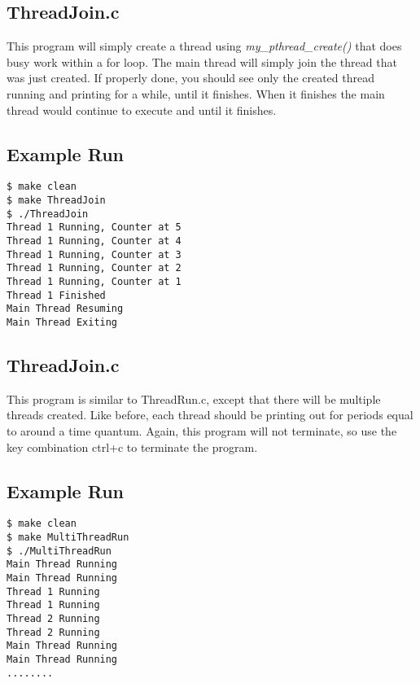 \documentclass{article}
\begin{document}
\subsection{ThreadJoin.c}
This program will simply create a thread using \textit{my\_pthread\_create()} that does busy work within a for loop. The main thread will simply join the thread that was just created. If properly done, you should see only the created thread running and printing for a while, until it finishes. When it finishes the main thread would continue to execute and until it finishes.

\subsection*{Example Run}
\begin{commandline}
	\begin{verbatim}
$ make clean
$ make ThreadJoin
$ ./ThreadJoin
Thread 1 Running, Counter at 5
Thread 1 Running, Counter at 4
Thread 1 Running, Counter at 3 
Thread 1 Running, Counter at 2 
Thread 1 Running, Counter at 1 
Thread 1 Finished
Main Thread Resuming
Main Thread Exiting
	\end{verbatim}
\end{commandline}


\subsection{ThreadJoin.c}
This program is similar to ThreadRun.c, except that there will be multiple threads created. Like before, each thread should be printing out for periods equal to around a time quantum. Again, this program will not terminate, so use the key combination ctrl+c to terminate the program.
\subsection*{Example Run}
\begin{commandline}
	\begin{verbatim}
$ make clean
$ make MultiThreadRun 
$ ./MultiThreadRun 
Main Thread Running 
Main Thread Running 
Thread 1 Running 
Thread 1 Running 
Thread 2 Running 
Thread 2 Running
Main Thread Running 
Main Thread Running 
........
	\end{verbatim}
\end{commandline}
\end{document}
